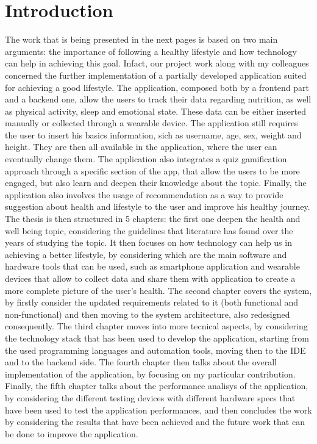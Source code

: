 \section*{Introduction}
The work that is being presented in the next pages is based on two main arguments: the importance of following a healthy lifestyle and how technology can help in achieving this goal. Infact, our project work along with my colleagues concerned the further implementation of a partially developed application suited for achieving a good lifestyle. The application, composed both by a frontend part and a backend one, allow the users to track their data regarding nutrition, as well as physical activity, sleep and emotional state. These data can be either inserted manually or collected through a wearable device. The application still requires the user to insert his basics information, sich as username, age, sex, weight and height. They are then all available in the application, where the user can eventually change them. The application also integrates a quiz gamification approach through a specific section of the app, that allow the users to be more engaged, but also learn and deepen their knowledge about the topic. Finally, the application also involves the usage of recommendation as a way to provide suggestion about health and lifestyle to the user and improve his healthy journey. The thesis is then structured in 5 chapters: the first one deepen the health and well being topic, considering the guidelines that literature has found over the years of studying the topic. It then focuses on how technology can help us in achieving a better lifestyle, by considering which are the main software and hardware tools that can be used, such as smartphone application and wearable devices that allow to collect data and share them with application to create a more complete picture of the user's health. The second chapter covers the system, by firstly consider the updated requirements related to it (both functional and non-functional) and then moving to the system architecture, also redesigned consequently. The third chapter moves into more tecnical aspects, by considering the technology stack that has been used to develop the application, starting from the used programming languages and automation tools, moving then to the IDE and to the backend side. The fourth chapter then talks about the overall implementation of the application, by focusing on my particular contribution.  Finally, the fifth chapter talks about the performance analisys of the application, by considering the different testing devices with different hardware specs that have been used to test the application performances, and then concludes the work by considering the results that have been achieved and the future work that can be done to improve the application.